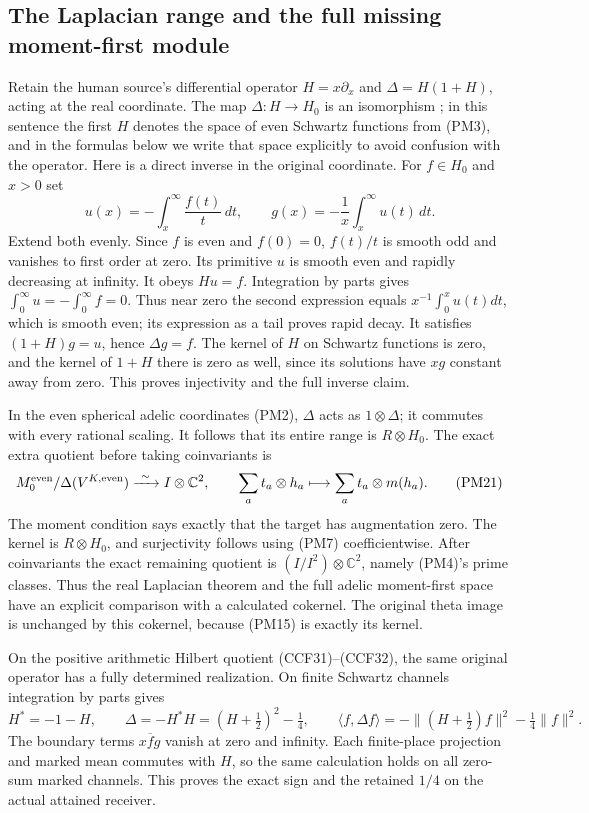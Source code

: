 \documentclass[11pt,a4paper]{article}
\theoremstyle{definition}\newtheorem{definition}[theorem]{Definition}
\begin{document}
\subsection{The Laplacian range and the full missing moment-first module}

Retain the human source's differential operator
$H=x\partial_x$ and $\Delta=H(1+H)$, acting at the real
coordinate. The map $\Delta:H\to H_0$ is an isomorphism
\cite[\texttt{quotbruhatschwartz}]{ConnesConsaniHochschild};
in this sentence the first $H$ denotes the space of even
Schwartz functions from (PM3), and in the formulas below we
write that space explicitly to avoid confusion with the operator.
Here is a direct inverse in the original coordinate. For
$f\in H_0$ and $x>0$ set
\[
 u(x)=-\int_x^\infty\frac{f(t)}t\,dt,
 \qquad g(x)=-\frac1x\int_x^\infty u(t)\,dt.
 \tag{PM20}
\]
Extend both evenly. Since $f$ is even and $f(0)=0$,
$f(t)/t$ is smooth odd and vanishes to first order at zero.
Its primitive $u$ is smooth even and rapidly decreasing at
infinity. It obeys $Hu=f$. Integration by parts gives
$\int_0^\infty u=-\int_0^\infty f=0$. Thus near zero the
second expression equals $x^{-1}\int_0^xu(t)dt$, which is
smooth even; its expression as a tail proves rapid decay.
It satisfies $(1+H)g=u$, hence $\Delta g=f$.
The kernel of $H$ on Schwartz functions is zero, and the
kernel of $1+H$ there is zero as well, since its solutions
have $xg$ constant away from zero. This proves injectivity
and the full inverse claim.

In the even spherical adelic coordinates (PM2), $\Delta$
acts as $1\otimes\Delta$; it commutes with every rational
scaling. It follows that its entire range is $R\otimes H_0$.
The exact extra quotient before taking coinvariants is
\[
 M_0^{\rm even}/\Delta(V^{K,\rm even})
       \xrightarrow{\ \sim\ } I\otimes\mathbb C^2,
 \qquad \sum_at_a\otimes h_a\longmapsto
                         \sum_at_a\otimes m(h_a).
 \tag{PM21}
\]
The moment condition says exactly that the target has
augmentation zero. The kernel is $R\otimes H_0$, and
surjectivity follows using (PM7) coefficientwise. After
coinvariants the exact remaining quotient is
$(I/I^2)\otimes\mathbb C^2$, namely (PM4)'s prime classes.
Thus the real Laplacian theorem and the full adelic
moment-first space have an explicit comparison with a
calculated cokernel. The original theta image is unchanged
by this cokernel, because (PM15) is exactly its kernel.

On the positive arithmetic Hilbert quotient (CCF31)--(CCF32),
the same original operator has a fully determined realization.
On finite Schwartz channels integration by parts gives
\[
 H^*=-1-H,\qquad
 \Delta=-H^*H=(H+\tfrac12)^2-\tfrac14,
 \qquad
 \langle f,\Delta f\rangle
       =-\|(H+\tfrac12)f\|^2-\tfrac14\|f\|^2.
 \tag{PM22}
\]
The boundary terms $x\overline f g$ vanish at zero and
infinity. Each finite-place projection and marked mean
commutes with $H$, so the same calculation holds on all
zero-sum marked channels. This proves the exact sign and
the retained $1/4$ on the actual attained receiver.
\end{document}
